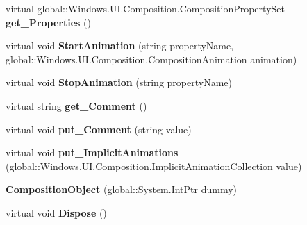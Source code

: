 \begin{DoxyCompactItemize}
virtual global\+::\+Windows.\+U\+I.\+Composition.\+Composition\+Property\+Set {\bfseries get\+\_\+\+Properties} ()
\item 
\mbox{\label{class_windows_1_1_u_i_1_1_composition_1_1_composition_object_af5a951dd44f067e4376daa62bcd893a1}} 
virtual void {\bfseries Start\+Animation} (string property\+Name, global\+::\+Windows.\+U\+I.\+Composition.\+Composition\+Animation animation)
\item 
\mbox{\label{class_windows_1_1_u_i_1_1_composition_1_1_composition_object_a1cd6b40941abd315607a06f492a8bc8f}} 
virtual void {\bfseries Stop\+Animation} (string property\+Name)
\item 
\mbox{\label{class_windows_1_1_u_i_1_1_composition_1_1_composition_object_ae75723b4139b9231f070eeeff95eb764}} 
virtual string {\bfseries get\+\_\+\+Comment} ()
\item 
\mbox{\label{class_windows_1_1_u_i_1_1_composition_1_1_composition_object_a489899a008945284e6ce17e08c880cb7}} 
virtual void {\bfseries put\+\_\+\+Comment} (string value)
\item 
\mbox{\label{class_windows_1_1_u_i_1_1_composition_1_1_composition_object_ad8d4008a5c31ce42878ce448fe3e5598}} 
virtual void {\bfseries put\+\_\+\+Implicit\+Animations} (global\+::\+Windows.\+U\+I.\+Composition.\+Implicit\+Animation\+Collection value)
\item 
\mbox{\label{class_windows_1_1_u_i_1_1_composition_1_1_composition_object_a31b74b02386afece7eb73f6d8009fdea}} 
{\bfseries Composition\+Object} (global\+::\+System.\+Int\+Ptr dummy)
\item 
\mbox{\label{class_windows_1_1_u_i_1_1_composition_1_1_composition_object_a443e6ebcc8d54382c90b7a6309ef1b1f}} 
virtual void {\bfseries Dispose} ()
\item 
\mbox{\label{class_windows_1_1_u_i_1_1_composition_1_1_composition_object_a02238179cbd70c9e4a518009d12e39e7}} 

\end{DoxyCompactItemize}

